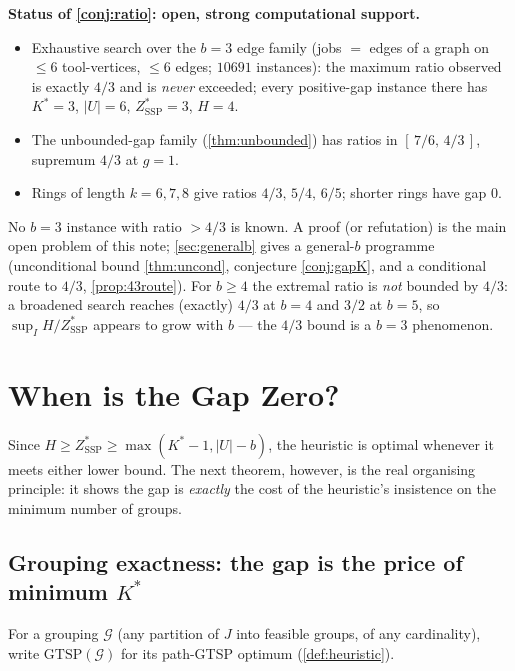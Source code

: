 \documentclass[11pt,a4paper]{article}
\theoremstyle{plain}
\theoremstyle{definition}
\newcommand{\Kstar}{K^{*}}
\newcommand{\ZSSP}{Z_{\mathrm{SSP}}^{*}}
\begin{document}
\begin{openproblem}
\textbf{Status of \cref{conj:ratio}: open, strong computational support.}
\begin{itemize}
\item Exhaustive search over the $b=3$ edge family (jobs $=$ edges of a graph on
$\le 6$ tool-vertices, $\le 6$ edges; $10691$ instances): the maximum ratio observed is
exactly $4/3$ and is \emph{never} exceeded; every positive-gap instance there has
$\Kstar=3$, $|U|=6$, $\ZSSP=3$, $H=4$.
\item The unbounded-gap family (\cref{thm:unbounded}) has ratios in $[\,7/6,\,4/3\,]$,
supremum $4/3$ at $g=1$.
\item Rings of length $k=6,7,8$ give ratios $4/3,\,5/4,\,6/5$; shorter rings have gap $0$.
\end{itemize}
No $b=3$ instance with ratio $>4/3$ is known. A proof (or refutation) is the main open
problem of this note; \cref{sec:generalb} gives a general-$b$ programme (unconditional
bound \cref{thm:uncond}, conjecture \cref{conj:gapK}, and a conditional route to $4/3$,
\cref{prop:43route}). For $b\ge4$ the extremal ratio is \emph{not} bounded by $4/3$: a
broadened search reaches (exactly) $4/3$ at $b=4$ and $3/2$ at $b=5$, so $\sup_I H/\ZSSP$
appears to grow with $b$ --- the $4/3$ bound is a $b=3$ phenomenon.
\end{openproblem}

\section{When is the Gap Zero?}
\label{sec:zerogap}

Since $H\ge\ZSSP\ge\max(\Kstar-1,|U|-b)$, the heuristic is optimal whenever it meets
either lower bound. The next theorem, however, is the real organising principle: it shows
the gap is \emph{exactly} the cost of the heuristic's insistence on the minimum number of
groups.

\subsection{Grouping exactness: the gap is the price of minimum $\Kstar$}

For a grouping $\mathcal{G}$ (any partition of $J$ into feasible groups, of any
cardinality), write $\mathrm{GTSP}(\mathcal{G})$ for its path-GTSP optimum
(\cref{def:heuristic}).
\end{document}
